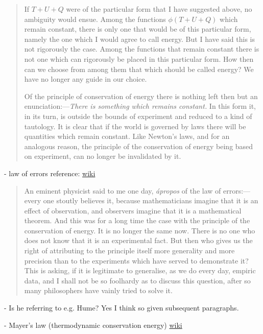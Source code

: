  \begin{quote}
     If $T + U + Q$ were of the particular form that I have suggested above, no ambiguity would ensue.  Among the functions $\phi(T + U + Q)$ which remain constant, there is only one that would be of this particular form, namely the one which I would agree to call energy.  But I have said this is not rigorously the case.  Among the functions that remain constant there is not one which can rigorously be placed in this particular form.  How then can we choose from among them that which should be called energy?  We have no longer any guide in our choice.
     
     Of the principle of conservation of energy there is nothing left then but an enunciation:---\emph{There is something which remains constant.}  In this form it, in its turn, is outside the bounds of experiment and reduced to a kind of tautology.  It is clear that if the world is governed by laws there will be quantities which remain constant.  Like Newton's laws, and for an analogous reason, the principle of the conservation of energy being based on experiment, can no longer be invalidated by it.  \citep[p. 127-128]{Poincare1952}
 \end{quote}
 
 - law of errors reference: \href{https://en.wikipedia.org/wiki/Laplace_distribution}{wiki}
 
 \begin{quote}
     An eminent physicist said to me one day, \emph{\'apropos} of the law of errors:---every one stoutly believes it, because mathematicians imagine that it is an effect of observation, and observers imagine that it is a mathematical theorem.  And this was for a long time the case with the principle of the conservation of energy.  It is no longer the same now.  There is no one who does not know that it is an experimental fact.  But then who gives us the right of attributing to the principle itself more generality and more precision than to the experiments which have served to demonstrate it?  This is asking, if it is legitimate to generalise, as we do every day, empiric data, and I shall not be so foolhardy as to discuss this question, after so many philosophers have vainly tried to solve it.  \citep[p. 129]{Poincare1952}
 \end{quote}
 
 - Is he referring to e.g. Hume?  Yes I think so given subsequent paragraphs.
 
 - Mayer's law (thermodynamic conservation energy) \href{https://en.wikipedia.org/wiki/Julius_von_Mayer}{wiki}
 
